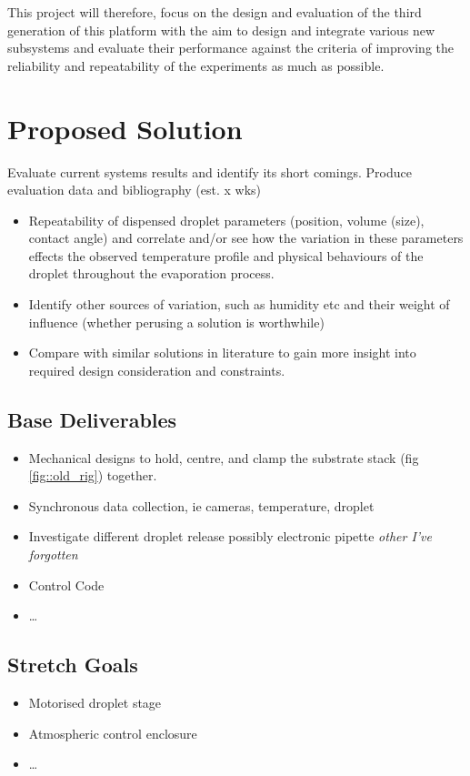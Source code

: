 \documentclass[11pt, a4paper, twoside, openright]{report}
\begin{document}
This project will therefore, focus on the design and evaluation of the third generation of this platform with the aim to design and integrate various new subsystems and evaluate their performance against the criteria of improving the reliability and repeatability of the experiments as much as possible.

\section{Proposed Solution}

Evaluate current systems results and identify its short comings. Produce evaluation data and bibliography (est. x wks)
\begin{itemize}
  \item Repeatability of dispensed droplet parameters (position, volume (size), contact angle) and correlate and/or see how the variation in these parameters effects the observed temperature profile and physical behaviours of the droplet throughout the evaporation process.
  \item Identify other sources of variation, such as humidity etc and their weight of influence (whether perusing a solution is worthwhile)
  \item Compare with similar solutions in literature to gain more insight into required design consideration and constraints.
\end{itemize}



\subsection{Base Deliverables}
\begin{itemize}
  \item Mechanical designs to hold, centre, and clamp the substrate stack (fig \ref{fig::old_rig}) together.
  \item Synchronous data collection, ie cameras, temperature, droplet
  \item Investigate different droplet release possibly electronic pipette \textit{other I've forgotten}
  \item Control Code
  \item \dots
\end{itemize}

\subsection{Stretch Goals}
\begin{itemize}
  \item Motorised droplet stage
  \item Atmospheric control enclosure
  \item \dots
\end{itemize}
\end{document}
